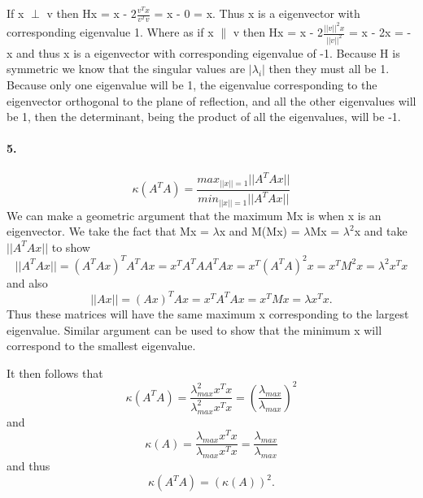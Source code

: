 \documentclass[12pt]{article}
\begin{document}
	If x $\perp$ v then Hx = x - $2\frac{v^Tx}{v^Tv}$ = x - 0 = x. Thus x is a eigenvector with corresponding eigenvalue 1. Where as if x $\parallel$ v then Hx = x - 2$\frac{||v||^2x}{||v||^2}$ = x - 2x = -x and thus x is a eigenvector with corresponding eigenvalue of -1. Because H is symmetric we know that the singular values are $|\lambda_i|$ then they must all be 1. Because only one eigenvalue will be 1, the eigenvalue corresponding to the eigenvector orthogonal to the plane of reflection, and all the other eigenvalues will be 1, then the determinant, being the product of all the eigenvalues, will be -1.
	
\paragraph{5.}
	\[
	\kappa(A^TA) = \frac{max_{||x||=1}||A^TAx||}{min_{||x||=1}||A^TAx||}
	\]
	We can make a geometric argument that the maximum Mx is when x is an eigenvector. We take the fact that Mx = $\lambda$x and M(Mx) = $\lambda$Mx = $\lambda^2$x and take $||A^TAx||$ to show 
	\[
	||A^TAx|| = (A^TAx)^TA^TAx = x^TA^TAA^TAx = x^T(A^TA)^2x = x^TM^2x = \lambda^2x^Tx
	\]
	and also
	\[
	||Ax|| = (Ax)^TAx = x^TA^TAx = x^TMx = \lambda x^Tx.
	\]
	Thus these matrices will have the same maximum x corresponding to the largest eigenvalue. Similar argument can be used to show that the minimum x will correspond to the smallest eigenvalue. 
	
	It then follows that 
	\[
	\kappa(A^TA) = \frac{\lambda_{max}^2x^Tx}{\lambda_{max}^2x^Tx} = \left(\frac{\lambda_{max}}{\lambda_{max}}\right)^2
	\]
	and 
	\[
	\kappa(A) = \frac{\lambda_{max}x^Tx}{\lambda_{max}x^Tx} = \frac{\lambda_{max}}{\lambda_{max}}
	\]
	and thus 
	\[
	\kappa(A^TA) = \left(\kappa(A)\right)^2.
	\]
\end{document}
